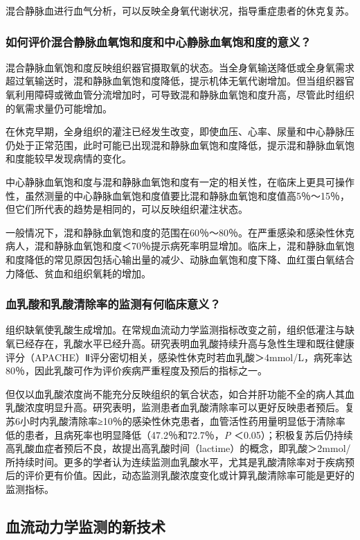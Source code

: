 混合静脉血进行血气分析，可以反映全身氧代谢状况，指导重症患者的休克复苏。

\subsubsection{如何评价混合静脉血氧饱和度和中心静脉血氧饱和度的意义？}

混合静脉血氧饱和度反映组织器官摄取氧的状态。当全身氧输送降低或全身氧需求超过氧输送时，混和静脉血氧饱和度降低，提示机体无氧代谢增加。但当组织器官氧利用障碍或微血管分流增加时，可导致混和静脉血氧饱和度升高，尽管此时组织的氧需求量仍可能增加。

在休克早期，全身组织的灌注已经发生改变，即使血压、心率、尿量和中心静脉压仍处于正常范围，此时可能已出现混和静脉血氧饱和度降低，提示混和静脉血氧饱和度能较早发现病情的变化。

中心静脉血氧饱和度与混和静脉血氧饱和度有一定的相关性，在临床上更具可操作性，虽然测量的中心静脉血氧饱和度值要比混和静脉血氧饱和度值高5％～15％，但它们所代表的趋势是相同的，可以反映组织灌注状态。

一般情况下，混和静脉血氧饱和度的范围在60％～80％。在严重感染和感染性休克病人，混和静脉血氧饱和度＜70％提示病死率明显增加。临床上，混和静脉血氧饱和度降低的常见原因包括心输出量的减少、动脉血氧饱和度下降、血红蛋白氧结合力降低、贫血和组织氧耗的增加。

\subsubsection{血乳酸和乳酸清除率的监测有何临床意义？}

组织缺氧使乳酸生成增加。在常规血流动力学监测指标改变之前，组织低灌注与缺氧已经存在，乳酸水平已经升高。研究表明血乳酸持续升高与急性生理和既往健康评分（APACHE）Ⅱ评分密切相关，感染性休克时若血乳酸＞4mmol/L，病死率达80％，因此乳酸可作为评价疾病严重程度及预后的指标之一。

但仅以血乳酸浓度尚不能充分反映组织的氧合状态，如合并肝功能不全的病人其血乳酸浓度明显升高。研究表明，监测患者血乳酸清除率可以更好反映患者预后。复苏6小时内乳酸清除率≥10％的感染性休克患者，血管活性药用量明显低于清除率低的患者，且病死率也明显降低（47.2％和72.7％，\emph{P}
＜0.05）；积极复苏后仍持续高乳酸血症者预后不良，故提出高乳酸时间（lactime）的概念，即乳酸＞2mmol/所持续时间。更多的学者认为连续监测血乳酸水平，尤其是乳酸清除率对于疾病预后的评价更有价值。因此，动态监测乳酸浓度变化或计算乳酸清除率可能是更好的监测指标。

\subsection{血流动力学监测的新技术}

